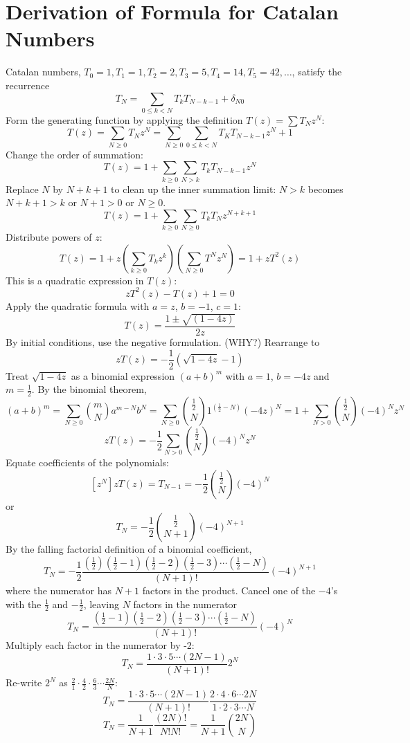 \documentclass[11pt, oneside]{article}   	%
\begin{document}
\section{Derivation of Formula for Catalan Numbers}
Catalan numbers, $T_0=1, T_1=1, T_2=2, T_3=5, T_4=14, T_5=42, \dots$, satisfy the recurrence
\[
	T_N = \sum_{0 \le k < N} T_k T_{N-k-1} + \delta_{N0}
\]
Form the generating function by applying the definition $T(z) = \sum T_N z^N$:
\[
	T(z) = \sum_{N \ge 0} T_N z^N = \sum_{N \ge 0} \sum_{0 \le k < N} T_K T_{N-k-1} z^N + 1
\]
Change the order of summation:
\[
	T(z) = 1 + \sum_{k \ge 0} \sum_{N>k} T_k T_{N-k-1} z^N
\]
Replace $N$ by $N+k+1$ to clean up the inner summation limit: $N>k$ becomes $N+k+1 > k$ or $N+1>0$ or $N \ge 0$.
\[
	T(z) = 1 + \sum_{k \ge 0} \sum_{N \ge 0} T_k T_N z^{N+k+1}
\]
Distribute powers of $z$:
\[
	T(z) = 1 + z \left(\sum_{k \ge 0} T_k z^k\right) \left( \sum_{N \ge 0} T^N z^N \right) = 1 + z T^2(z)
\]
This is a quadratic expression in $T(z)$:
\[
	zT^2(z) - T(z) + 1 = 0
\]
Apply the quadratic formula with $a=z$, $b=-1$, $c=1$:
\[
	T(z) = \frac{1 \pm \sqrt{(1-4z)}}{2z}
\]
By initial conditions, use the negative formulation. (WHY?) Rearrange to
\[
	zT(z) = -\frac{1}{2}\left(\sqrt{1-4z} -1\right)
\]
Treat $\sqrt{1-4z}$ as a binomial expression $(a+b)^m$ with $a=1$, $b=-4z$ and $m=\frac{1}{2}$. By the binomial theorem,
\[
	(a+b)^m =  \sum_{N\ge0} \binom{m}{N} a^{m-N} b^N =  \sum_{N\ge0} \binom{\frac{1}{2}}{N} 1^{(\frac{1}{2}-N)} (-4z)^N = 1+ \sum_{N>0} \binom{\frac{1}{2}}{N} (-4)^N z^N
\]
\[
	zT(z) = -\frac{1}{2}\sum_{N>0} \binom{\frac{1}{2}}{N} (-4)^N z^N
\]
Equate coefficients of the polynomials:
\[
	\left[ z^N \right] zT(z) = T_{N-1} = -\frac{1}{2} \binom{\frac{1}{2}}{N} (-4)^N
\]
or
\[
	T_N = -\frac{1}{2} \binom{\frac{1}{2}}{N+1} (-4)^{N+1}
\]
By the falling factorial definition of a binomial coefficient,
\[
	T_N = -\frac{1}{2} \frac{(\frac{1}{2})(\frac{1}{2}-1)(\frac{1}{2}-2)(\frac{1}{2}-3)\cdots(\frac{1}{2}-N)}{(N+1)!} (-4)^{N+1}
\]
where the numerator has $N+1$ factors in the product. Cancel one of the $-4$'s with the $\frac{1}{2}$ and $-\frac{1}{2}$, leaving $N$ factors in the numerator 
\[
	T_N = \frac{(\frac{1}{2}-1)(\frac{1}{2}-2)(\frac{1}{2}-3)\cdots(\frac{1}{2}-N)}{(N+1)!} (-4)^{N}
\]
Multiply each factor in the numerator by -2:
\[
	T_N = \frac{1 \cdot 3 \cdot 5 \cdots (2N-1)}{(N+1)!} 2^N
\]
Re-write $2^N$ as $\frac{2}{1} \cdot \frac{4}{2} \cdot \frac{6}{3} \cdots \frac{2N}{N}$:
\[
	T_N = \frac{1 \cdot 3 \cdot 5 \cdots (2N-1) }{(N+1)!} \frac{2 \cdot 4 \cdot 6 \cdots 2N}{1 \cdot 2 \cdot 3 \cdots N}
\]
\[
	T_N = \frac{1}{N+1} \frac{(2N)!}{N! N!} = \frac{1}{N+1} \binom{2N}{N}
\]
\end{document}
